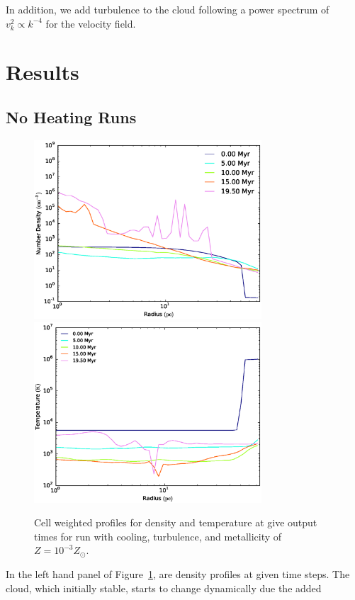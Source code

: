 \documentclass[useAMS,usenatbib]{mn2e}
\begin{document}
In addition, we add turbulence to the cloud following a power spectrum of
$v_k^2 \propto k^{-4}$ for the velocity field.

% 
\section{Results}
\label{sec:results}
\subsection{No Heating Runs}
\begin{figure}
\begin{center}
\includegraphics[width=8.5cm]{Images/density_series}
\includegraphics[width=8.5cm]{Images/temperature_series}
\end{center}
\caption{\label{fig:profile_turbulence}} Cell weighted profiles for density
and temperature at give output times for run with cooling, turbulence, and
metallicity of $Z=10^{-3}Z_\odot$.
\end{figure}
In the left hand panel of Figure~\ref{fig:profile_turbulence}, are density profiles at given time steps.
The cloud, which initially stable, starts to change dynamically due the added
\end{document}
